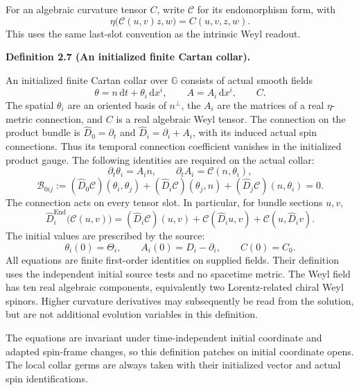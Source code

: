 \documentclass[
  english,
  11pt,
  reqno]{amsart}
\makeatletter
\newcommand{\pandocstatementheading}[1]{%
  \par\if@nobreak\else
    \addpenalty{\@beginparpenalty}%
    \addvspace{.5\baselineskip plus .2\baselineskip minus .2\baselineskip}%
  \fi
  {\normalfont\bfseries #1\par}%
  \nobreak\@afterindenttrue\@afterheading
}
\makeatother
\begin{document}
For an algebraic curvature tensor \(C\), write \(\mathcal C\) for its
endomorphism form, with%
 \[
\eta\bigl(\mathcal C(u,v)z,w\bigr)=C(u,v,z,w).
\] This uses the same last-slot convention as the intrinsic Weyl
readout.

\pandocstatementheading{\leavevmode{}\label{def:online-finite-cartan-collar}Definition 2.7 (An initialized finite Cartan collar).}

An initialized finite Cartan collar over \(\mathbb G\) consists of
actual smooth fields%
 \[
\theta=n\,\mathrm dt+\theta_i\,\mathrm dx^i,
\qquad
A=A_i\,\mathrm dx^i,
\qquad C.
\] The spatial \(\theta_i\) are an oriented basis of \(n^\perp\), the
\(A_i\) are the matrices of a real \(\eta\)-metric connection, and \(C\)
is a real algebraic Weyl tensor. The connection on the product bundle is
\(\widehat D_0=\partial_t\) and \(\widehat D_i=\partial_i+A_i\), with
its induced actual spin connections. Thus its temporal connection
coefficient vanishes in the initialized product gauge. The following
identities are required on the actual collar:%
 \[
\partial_t\theta_i=A_i n,
\qquad
\partial_t A_i=\mathcal C(n,\theta_i),
\] \label{eq:online-cartan-mixed-bianchi} \[
\mathcal B_{0ij}
:=
(\widehat D_0\mathcal C)(\theta_i,\theta_j)
+(\widehat D_i\mathcal C)(\theta_j,n)
+(\widehat D_j\mathcal C)(n,\theta_i)
=0.
\] The connection acts on every tensor slot. In particular, for bundle
sections \(u,v\),%
 \[
\widehat D_i^{\operatorname{End}}\bigl(\mathcal C(u,v)\bigr)
=(\widehat D_i\mathcal C)(u,v)
+\mathcal C(\widehat D_i u,v)
+\mathcal C(u,\widehat D_i v).
\] The initial values are prescribed by the source:%
 \[
\theta_i(0)=\Theta_i,
\qquad
A_i(0)=D_i-\partial_i,
\qquad
C(0)=C_0.
\] All equations are finite first-order identities on supplied fields.
Their definition uses the independent initial source tests and no
spacetime metric. The Weyl field has ten real algebraic components,
equivalently two Lorentz-related chiral Weyl spinors. Higher curvature
derivatives may subsequently be read from the solution, but are not
additional evolution variables in this definition.

The equations are invariant under time-independent initial coordinate
and adapted spin-frame changes, so this definition patches on initial
coordinate opens. The local collar germs are always taken with their
initialized vector and actual spin identifications.
\end{document}
